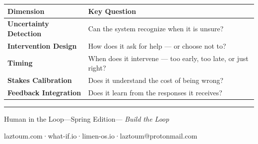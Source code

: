 \documentclass[
  11pt,
  oneside,
  DIV=12,
]{scrartcl}
\begin{document}
\begin{tcolorbox}[
  enhanced,
  colframe=ConceptBlue!40,
  colback=ConceptIce!60,
  top=8pt, bottom=8pt, left=12pt, right=12pt,
  arc=4pt,
]
\renewcommand{\arraystretch}{1.5}
\begin{tabularx}{\linewidth}{@{}>{\bfseries\color{ConceptBlue}\small}lX@{}}
\toprule
Dimension & Key Question \\
\midrule
Uncertainty Detection  & Can the system recognize when it is unsure? \\
Intervention Design    & How does it ask for help — or choose not to? \\
Timing                 & When does it intervene — too early, too late, or just right? \\
Stakes Calibration     & Does it understand the cost of being wrong? \\
Feedback Integration   & Does it learn from the responses it receives? \\
\bottomrule
\end{tabularx}
\end{tcolorbox}

\bigskip

\begin{center}
  {\color{RuleGray}\rule{0.6\linewidth}{0.4pt}}

  \vspace{0.4cm}

  {\small\sffamily\color{gray}
    Human in the Loop\enspace —\enspace Spring Edition\enspace —\enspace
    \textit{Build the Loop}}

  \vspace{0.2cm}

  {\footnotesize\color{gray}
    laztoum.com\enspace·\enspace what-if.io\enspace·\enspace limen-os.io\enspace·\enspace laztoum@protonmail.com}
\end{center}
\end{document}
